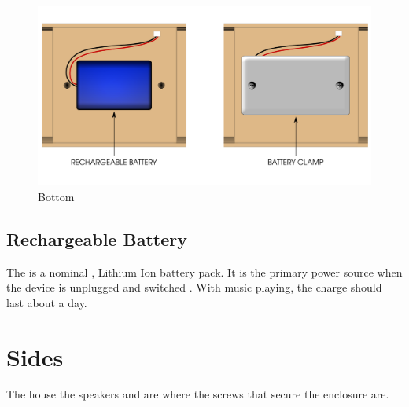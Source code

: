 \begin{figure}[H]
\centering
  \includegraphics{images/bottom.png}
\caption{Bottom}
\end{figure}

\section{Rechargeable Battery} \label{Rechargeable Battery}

The  is a nominal , 
Lithium Ion battery pack.  It is the primary power source when the device is
unplugged and switched .  With music playing, the charge should last
about a day.

\chapter{Sides} \label{Sides}

The  house the speakers and are where the screws that secure the
enclosure are.

